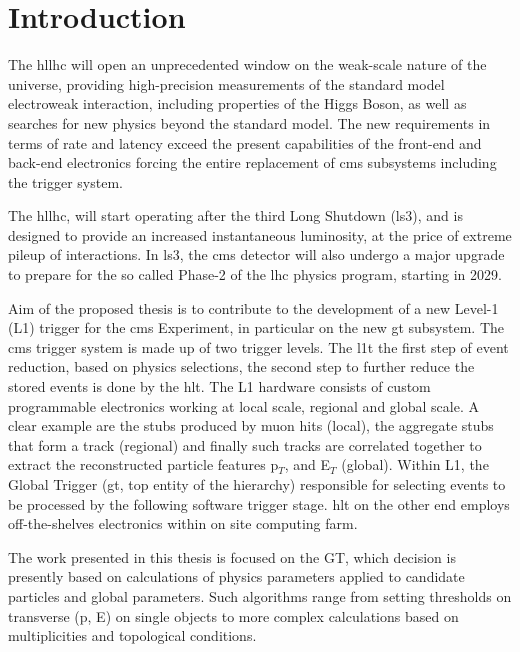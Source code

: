 \documentclass[../../main.tex]{subfiles}
\begin{document}
\chapter{Introduction}
    
\label{sec:introduction}
    
    
The \acrfull{hllhc} will open an unprecedented window on the weak-scale nature of the universe, providing high-precision measurements of the standard model electroweak interaction, including properties of the Higgs Boson, as well as searches for new physics beyond the standard model. The new requirements in terms of rate and latency exceed the present capabilities of the front-end and back-end electronics forcing the entire replacement of \acrshort{cms} subsystems including the trigger system.
    
The \acrshort{hllhc}, will start operating after the third Long Shutdown (\acrshort{ls3}), and is designed to provide an increased instantaneous luminosity, at the price of extreme pileup of interactions. In \acrshort{ls3}, the \acrshort{cms} detector will also undergo a major upgrade to prepare for the so called Phase-2 of the \acrshort{lhc} physics program, starting in 2029.
    
Aim of the proposed thesis is to contribute to the development of a new Level-1 (L1) trigger for the \acrshort{cms} Experiment, in particular on the new \acrfull{gt} subsystem.  
The \acrshort{cms} trigger system is made up of two trigger levels. The \acrfull{l1t} the first step of event reduction, based on physics selections, the second step to further reduce the stored events is done by the \acrfull{hlt}. The L1 hardware consists of custom programmable electronics working at local scale, regional and global scale. A clear example are the stubs produced by muon hits (local), the aggregate stubs that form a track (regional) and finally such tracks are correlated together to extract the reconstructed particle features p$_T$, and E$_T$ (global). Within L1, the Global Trigger (\acrshort{gt}, top entity of the hierarchy) responsible for selecting events to be processed by the following software trigger stage. \acrshort{hlt} on the other end employs off-the-shelves electronics within on site computing farm. 
    
The work presented in this thesis is focused on the GT, which decision is presently based on calculations of physics parameters applied to candidate particles and global parameters. Such algorithms range from setting thresholds on transverse (p, E) on single objects to more complex calculations based on multiplicities and topological conditions.  
    
\end{document}
